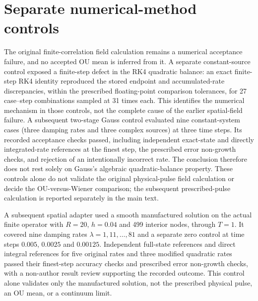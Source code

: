 \section{Separate numerical-method controls}\label{app:method-controls}
The original finite-correlation field calculation remains a numerical
acceptance failure, and no accepted OU mean is inferred from it. A separate
constant-source control exposed a finite-step defect in the RK4 quadratic
balance: an exact finite-step RK4 identity reproduced the stored endpoint and
accumulated-rate discrepancies, within the prescribed floating-point
comparison tolerances, for 27 case--step combinations sampled at 31 times
each. This identifies the numerical mechanism in those controls, not the
complete cause of the earlier spatial-field failure. A subsequent two-stage
Gauss control evaluated nine constant-system cases (three damping rates and
three complex sources) at three time steps. Its recorded acceptance checks
passed, including independent exact-state and directly integrated-rate
references at the finest step, the prescribed error non-growth checks, and
rejection of an intentionally incorrect rate. The conclusion therefore does
not rest solely on Gauss's algebraic quadratic-balance property. These
controls alone do not validate the original physical-pulse field calculation
or decide the OU-versus-Wiener comparison; the subsequent prescribed-pulse
calculation is reported separately in the main text.

A subsequent spatial adapter used a smooth manufactured solution on the actual
finite operator with $R=20$, $h=0.04$ and 499 interior nodes, through $T=1$.
It covered nine damping rates $\lambda=1,11,\ldots,81$ and a separate zero
control at time steps $0.005$, $0.0025$ and $0.00125$.
Independent full-state references and direct integral references for five
original rates and three modified quadratic rates passed their finest-step
accuracy checks and prescribed error non-growth checks, with a non-author
result review supporting the recorded outcome.
This control alone validates only the manufactured solution, not the prescribed
physical pulse, an OU mean, or a continuum limit.

